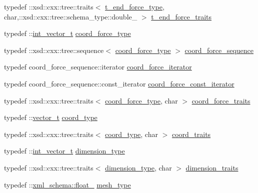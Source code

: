 \begin{DoxyCompactItemize}
\item 
typedef \+::xsd\+::cxx\+::tree\+::traits$<$ \hyperlink{classmembrane__t_a9c464d55e3d8162b6bb521d9dd6d761d}{t\+\_\+end\+\_\+force\+\_\+type}, char,\+::xsd\+::cxx\+::tree\+::schema\+\_\+type\+::double\+\_\+ $>$ \hyperlink{classmembrane__t_a6e52d2cbbfa0781d7ce3aec95ce1a7ab}{t\+\_\+end\+\_\+force\+\_\+traits}
\item 
typedef \+::\hyperlink{classint__vector__t}{int\+\_\+vector\+\_\+t} \hyperlink{classmembrane__t_a8866c2084ca9b88e98340080008777e5}{coord\+\_\+force\+\_\+type}
\item 
typedef \+::xsd\+::cxx\+::tree\+::sequence$<$ \hyperlink{classmembrane__t_a8866c2084ca9b88e98340080008777e5}{coord\+\_\+force\+\_\+type} $>$ \hyperlink{classmembrane__t_a2825c9df8bf471f2c5053a826cf6fcb0}{coord\+\_\+force\+\_\+sequence}
\item 
typedef coord\+\_\+force\+\_\+sequence\+::iterator \hyperlink{classmembrane__t_adb487c2f17c0b6197225dbc0beb9990c}{coord\+\_\+force\+\_\+iterator}
\item 
typedef coord\+\_\+force\+\_\+sequence\+::const\+\_\+iterator \hyperlink{classmembrane__t_a558f9ccc1036a61e199e93fe08646cec}{coord\+\_\+force\+\_\+const\+\_\+iterator}
\item 
typedef \+::xsd\+::cxx\+::tree\+::traits$<$ \hyperlink{classmembrane__t_a8866c2084ca9b88e98340080008777e5}{coord\+\_\+force\+\_\+type}, char $>$ \hyperlink{classmembrane__t_a5edce7be5d85743cf318cbc01750134e}{coord\+\_\+force\+\_\+traits}
\item 
typedef \+::\hyperlink{classvector__t}{vector\+\_\+t} \hyperlink{classmembrane__t_a0841f5bafc269d612a4b6fefcce1d73f}{coord\+\_\+type}
\item 
typedef \+::xsd\+::cxx\+::tree\+::traits$<$ \hyperlink{classmembrane__t_a0841f5bafc269d612a4b6fefcce1d73f}{coord\+\_\+type}, char $>$ \hyperlink{classmembrane__t_ad5ae6696a73759a2dacbed6d33371fbf}{coord\+\_\+traits}
\item 
typedef \+::\hyperlink{classint__vector__t}{int\+\_\+vector\+\_\+t} \hyperlink{classmembrane__t_afdd0310501689ebab285ec39821c5b76}{dimension\+\_\+type}
\item 
typedef \+::xsd\+::cxx\+::tree\+::traits$<$ \hyperlink{classmembrane__t_afdd0310501689ebab285ec39821c5b76}{dimension\+\_\+type}, char $>$ \hyperlink{classmembrane__t_aa3e274a54801b84c5dae45b44bfe86a0}{dimension\+\_\+traits}
\item 
typedef \+::\hyperlink{namespacexml__schema_ad7e04ab17bba0b3fdde43fb79ef6ed87}{xml\+\_\+schema\+::float\+\_\+} \hyperlink{classmembrane__t_a259dfb54e3d4a66cdd72b5b0831f4188}{mesh\+\_\+type}

\end{DoxyCompactItemize}
